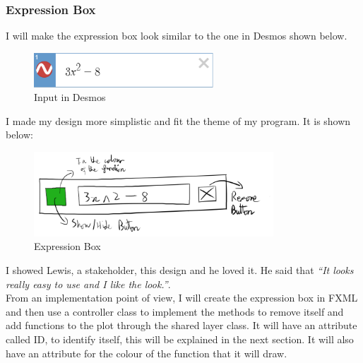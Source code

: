 \documentclass[../../../../main.tex]{subfiles}
\begin{document}
\subsubsection{Expression Box}
I will make the expression box look similar to the one in Desmos shown below.
\begin{figure}[H]
	\centering
	\includegraphics[width=0.6\textwidth]{images/desmos}
	\caption{Input in Desmos}
\end{figure}
I made my design more simplistic and fit the theme of my program. It is shown below:
\begin{figure}[H]
	\centering
	\includegraphics[width=0.8\textwidth]{images/expressionBox}
	\caption{Expression Box}
\end{figure}
I showed Lewis, a stakeholder, this design and he loved it. He said that \textit{``It looks really easy to use and I like the look.''}.\\
From an implementation point of view, I will create the expression box in FXML and then use a controller class to implement the methods to remove itself and add functions to the plot through the shared layer class. It will have an attribute called ID, to identify itself, this will be explained in the next section. It will also have an attribute for the colour of the function that it will draw.
\newpage
\end{document}
